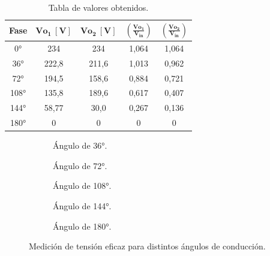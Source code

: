 \begin{table}[H]
\centering
  \begin{tabular}{|c|c|c|c|c|}
    \hline
      \textbf{Fase} & $\mathbf{Vo_1~[V]}$ & $\mathbf{Vo_2~[V]}$ & $\mathbf{(\frac{Vo_1}{V_{in}})}$ & $\mathbf{(\frac{Vo_2}{V_{in}})}$ \\
    \hline
      0°    & 234     & 234     & 1,064   & 1,064\\
      36°   & 222,8   & 211,6   & 1,013   & 0,962\\
      72°   & 194,5   & 158,6   & 0,884   & 0,721\\
      108°  & 135,8   & 189,6   & 0,617   & 0,407\\
      144°  & 58,77   & 30,0    & 0,267   & 0,136\\
      180°  & 0       & 0       & 0       & 0\\
    \hline
  \end{tabular}
\caption{Tabla de valores obtenidos.}
\label{tab:TablaExp2}
\end{table}

      \begin{figure}[H]
        \centering
        \begin{subfigure}[ht]{0.48\textwidth}
          \caption{Ángulo de 36°.}
        \end{subfigure}
        \hfill 
        \begin{subfigure}[ht]{0.48\textwidth}
          \caption{Ángulo de 72°.}
        \end{subfigure}
        \begin{subfigure}[ht]{0.48\textwidth}
          \caption{Ángulo de 108°.}
        \end{subfigure}
        \hfill 
        \begin{subfigure}[ht]{0.48\textwidth}
          \caption{Ángulo de 144°.}
        \end{subfigure}
        \begin{subfigure}[ht]{0.48\textwidth}
          \caption{Ángulo de 180°.}
        \end{subfigure}

        \caption{Medición de tensión eficaz para distintos ángulos de conducción.}
         \label{fig:MedicionAnguloConduccion}
      \end{figure}

